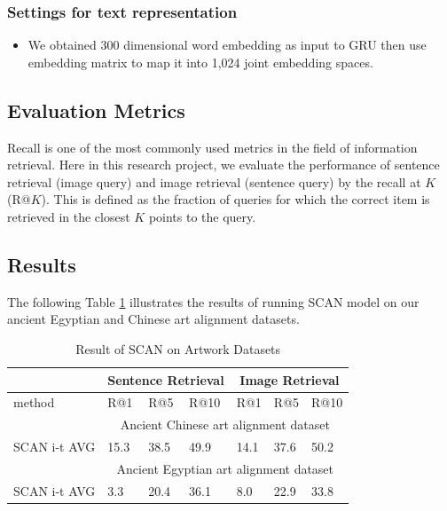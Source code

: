 \subsubsection{Settings for text representation}

\begin{itemize}
    \item We obtained 300 dimensional word embedding as input to GRU then use embedding matrix to map it into 1,024 joint embedding spaces.
\end{itemize}

\subsection{Evaluation Metrics}

Recall is one of the most commonly used metrics in the field of information retrieval. Here in this research project, we evaluate the performance of sentence retrieval (image query) and image retrieval (sentence query) by the recall at $K$ (R@$K$). This is defined as the fraction of queries for which the correct item is retrieved in the closest $K$ points to the query. 

\subsection{Results}

The following Table \ref{table:resultscan} illustrates the results of running SCAN model on our ancient Egyptian and Chinese art alignment datasets.

\begin{table}[h!]
\centering
\begin{tabular}{lllllll}
                       & \multicolumn{3}{c}{Sentence Retrieval} & \multicolumn{3}{c}{Image Retrieval} \\ \hline
method                 & R@1         & R@5         & R@10       & R@1        & R@5        & R@10      \\ \hline
\multicolumn{1}{r}{}   & \multicolumn{6}{c}{Ancient Chinese art alignment dataset}                   \\ \hline
SCAN i-t AVG & 15.3        & 38.5        & 49.9       & 14.1       & 37.6       & 50.2      \\ \hline
\multicolumn{1}{r}{}   & \multicolumn{6}{c}{Ancient Egyptian art alignment dataset}                    \\ \hline
SCAN i-t AVG & 3.3         & 20.4        & 36.1       & 8.0        & 22.9       & 33.8     
\end{tabular}
\caption{Result of SCAN on Artwork Datasets}
\label{table:resultscan}
\end{table}


